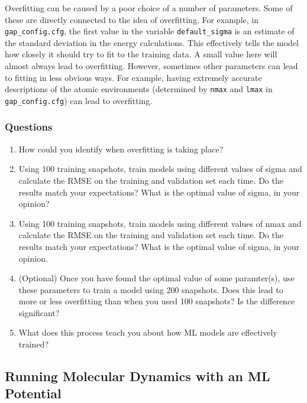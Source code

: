 \documentclass{article}
\begin{document}
Overfitting can be caused by a poor choice of a number of parameters. Some of these are directly connected to the idea of overfitting. For example, in \verb|gap_config.cfg|, the first value in the variable \verb|default_sigma| is an estimate of the standard deviation in the energy calculations. This effectively tells the model how closely it should try to fit to the training data. A small value here will almost always lead to overfitting. However, sometimes other parameters can lead to fitting in less obvious ways. For example, having extremely accurate descriptions of the atomic environments (determined by \verb|nmax| and \verb|lmax| in \verb|gap_config.cfg|) can lead to overfitting.

\subsubsection*{Questions}

\begin{enumerate}
\item How could you identify when overfitting is taking place?
\item Using 100 training snapshots, train models using different values of sigma and calculate the RMSE on the training and validation set each time. Do the results match your expectations? What is the optimal value of sigma, in your opinion?
\item Using 100 training snapshots, train models using different values of nmax and calculate the RMSE on the training and validation set each time. Do the results match your expectations? What is the optimal value of sigma, in your opinion.
\item (Optional) Once you have found the optimal value of some paramter(s), use these parameters to train a model using 200 snapshots. Does this lead to more or less overfitting than when you used 100 snapshots? Is the difference significant?
\item What does this process teach you about how ML models are effectively trained?

\end{enumerate}



\subsection{Running Molecular Dynamics with an ML Potential}
\label{sec:md}
\end{document}
